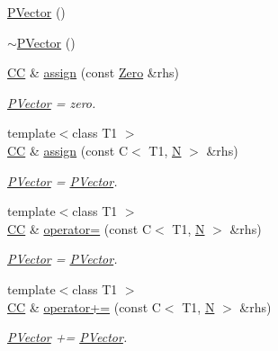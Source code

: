 \begin{DoxyCompactItemize}
\item 
\mbox{\hyperlink{classENSEM_1_1PVector_afc5f971e6ec88789c8205b2e03b1edfd}{P\+Vector}} ()
\item 
\mbox{\hyperlink{classENSEM_1_1PVector_a74ba2f55760e8ed1947ef3bb534400b6}{$\sim$\+P\+Vector}} ()
\item 
\mbox{\hyperlink{classENSEM_1_1PVector_a92dc0a0a301a3dc96f7be5d337019bc7}{CC}} \& \mbox{\hyperlink{classENSEM_1_1PVector_a2dec9eb5015ac1a8a261a20c08d9650c}{assign}} (const \mbox{\hyperlink{structENSEM_1_1Zero}{Zero}} \&rhs)
\begin{DoxyCompactList}\small\item\em \mbox{\hyperlink{classENSEM_1_1PVector}{P\+Vector}} = zero. \end{DoxyCompactList}\item 
{\footnotesize template$<$class T1 $>$ }\\\mbox{\hyperlink{classENSEM_1_1PVector_a92dc0a0a301a3dc96f7be5d337019bc7}{CC}} \& \mbox{\hyperlink{classENSEM_1_1PVector_ab908e56421fdbff29813fb8bdaecdb6f}{assign}} (const C$<$ T1, \mbox{\hyperlink{operator__name__util_8cc_a7722c8ecbb62d99aee7ce68b1752f337}{N}} $>$ \&rhs)
\begin{DoxyCompactList}\small\item\em \mbox{\hyperlink{classENSEM_1_1PVector}{P\+Vector}} = \mbox{\hyperlink{classENSEM_1_1PVector}{P\+Vector}}. \end{DoxyCompactList}\item 
{\footnotesize template$<$class T1 $>$ }\\\mbox{\hyperlink{classENSEM_1_1PVector_a92dc0a0a301a3dc96f7be5d337019bc7}{CC}} \& \mbox{\hyperlink{classENSEM_1_1PVector_a2917b5cc8ed23d68b4cc6f1cfb0f9172}{operator=}} (const C$<$ T1, \mbox{\hyperlink{operator__name__util_8cc_a7722c8ecbb62d99aee7ce68b1752f337}{N}} $>$ \&rhs)
\begin{DoxyCompactList}\small\item\em \mbox{\hyperlink{classENSEM_1_1PVector}{P\+Vector}} = \mbox{\hyperlink{classENSEM_1_1PVector}{P\+Vector}}. \end{DoxyCompactList}\item 
{\footnotesize template$<$class T1 $>$ }\\\mbox{\hyperlink{classENSEM_1_1PVector_a92dc0a0a301a3dc96f7be5d337019bc7}{CC}} \& \mbox{\hyperlink{classENSEM_1_1PVector_a39e015a8751290105c2960d1607c1ce8}{operator+=}} (const C$<$ T1, \mbox{\hyperlink{operator__name__util_8cc_a7722c8ecbb62d99aee7ce68b1752f337}{N}} $>$ \&rhs)
\begin{DoxyCompactList}\small\item\em \mbox{\hyperlink{classENSEM_1_1PVector}{P\+Vector}} += \mbox{\hyperlink{classENSEM_1_1PVector}{P\+Vector}}. \end{DoxyCompactList}\item 

\end{DoxyCompactItemize}
